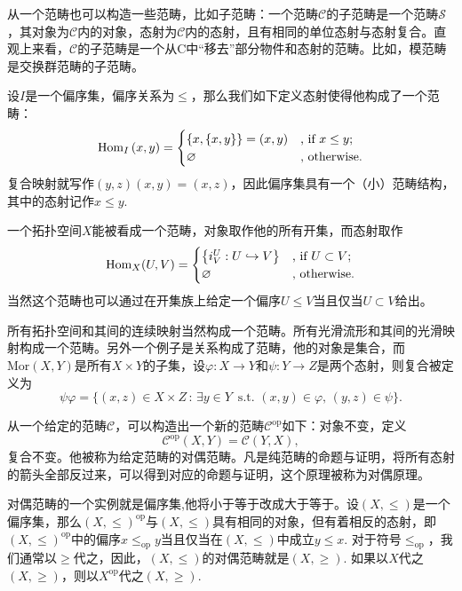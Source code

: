 从一个范畴也可以构造一些范畴，比如子范畴：一个范畴$\mathcal{C}$的子范畴是一个范畴$\mathcal{S}$，其对象为$\mathcal{C}$内的对象，态射为$\mathcal{C}$内的态射，且有相同的单位态射与态射复合。直观上来看，$\mathcal{C}$的子范畴是一个从C中“移去”部分物件和态射的范畴。比如，模范畴是交换群范畴的子范畴。

\para 设$I$是一个偏序集，偏序关系为$\leq$，那么我们如下定义态射使得他构成了一个范畴：
\[
	\operatorname{Hom}_{I}\left(x,y\right)=\begin{cases}
	\{x,\{x,y\}\}=(x,y)&\text{, if }x\leq y\text{;}\\
	\varnothing&\text{, otherwise}.
	\end{cases}
\]
复合映射就写作$(y,z)(x,y)=(x,z)$，因此偏序集具有一个（小）范畴结构，其中的态射记作$x\leq y$.

一个拓扑空间$X$能被看成一个范畴，对象取作他的所有开集，而态射取作
\[
	\operatorname{Hom}_{X}(U,V)=\begin{cases}
	\bigl\{i^U_V:U\hookrightarrow V\bigr\}&\text{, if }U\subset V\text{;}\\
	\varnothing&\text{, otherwise}.
	\end{cases}
\]
当然这个范畴也可以通过在开集族上给定一个偏序$U\leq V$当且仅当$U\subset V$给出。

所有拓扑空间和其间的连续映射当然构成一个范畴。所有光滑流形和其间的光滑映射构成一个范畴。另外一个例子是关系构成了范畴，他的对象是集合，而$\text{Mor}(X,Y)$是所有$X\times Y$的子集，设$\varphi:X\to Y$和$\psi:Y\to Z$是两个态射，则复合被定义为
\[
	\psi\varphi=\bigl\{(x,z)\in X\times Z\,:\,\exists y\in Y\,\text{ s.t. } (x,y)\in\varphi,\, (y,z)\in \psi\bigr\}.
\]

\para 从一个给定的范畴$\mathcal{C}$，可以构造出一个新的范畴$\mathcal{C}^{\mathrm{op}}$如下：对象不变，定义
\[\mathcal{C}^{\mathrm{op}}(X,Y)=\mathcal{C}(Y,X),\]复合不变。他被称为给定范畴的对偶范畴。凡是纯范畴的命题与证明，将所有态射的箭头全部反过来，可以得到对应的命题与证明，这个原理被称为对偶原理。\endpara

对偶范畴的一个实例就是偏序集,他将小于等于改成大于等于。设$(X,\leq)$是一个偏序集，那么$(X,\leq)^\text{op}$与$(X,\leq)$具有相同的对象，但有着相反的态射，即$(X,\leq)^\text{op}$中的偏序$x\leq_{\text{op}} y$当且仅当在$(X,\leq)$中成立$y\leq x$. 对于符号$\leq_{\text{op}}$，我们通常以$\geq$代之，因此，$(X,\leq)$的对偶范畴就是$(X,\geq)$. 如果以$X$代之$(X,\geq)$，则以$X^{\text{op}}$代之$(X,\geq)$.


